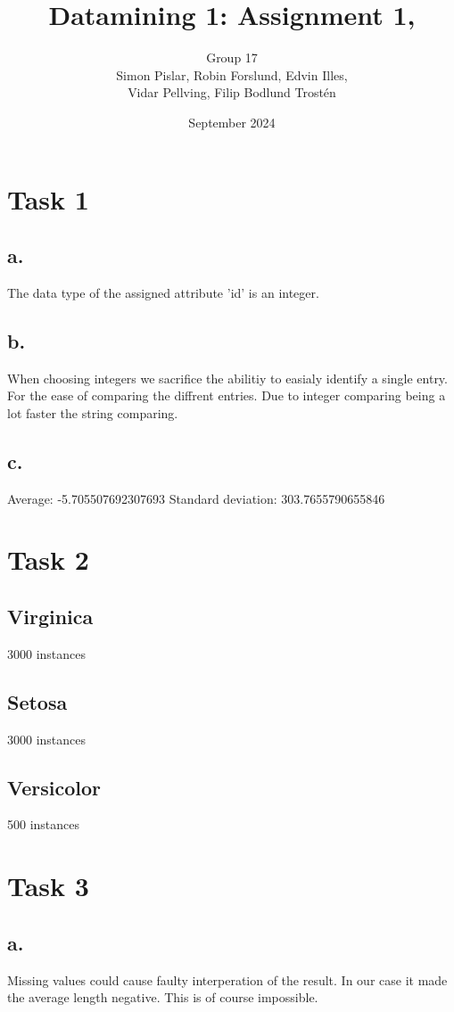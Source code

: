 \documentclass{article}
\title{\textbf{Datamining 1: Assignment 1, }}
\author{Group 17\\Simon Pislar, Robin Forslund, Edvin Illes, \\Vidar Pellving, Filip Bodlund Trostén}
\date{September 2024}
\begin{document}
\maketitle

\section{Task 1}
\subsection*{a.}
The data type of the assigned attribute 'id' is an integer.

\subsection*{b.}
When choosing integers we sacrifice the abilitiy to easialy identify a single entry. 
For the ease of comparing the diffrent entries. 
Due to integer comparing being a lot faster the string comparing.

\subsection*{c.}
Average: -5.705507692307693
Standard deviation: 303.7655790655846

\section{Task 2}
\subsection*{Virginica}
3000 instances
\subsection*{Setosa}
3000 instances
\subsection*{Versicolor}
500 instances

\section{Task 3}
\subsection*{a.}
Missing values could cause faulty interperation of the result. In our case it made the average length negative. 
This is of course impossible.
\end{document}
